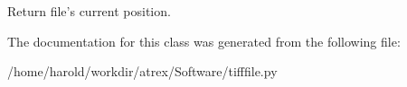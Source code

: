 \begin{DoxyVerb}Return file's current position.\end{DoxyVerb}
 

The documentation for this class was generated from the following file\-:\begin{DoxyCompactItemize}
\item 
/home/harold/workdir/atrex/\-Software/tifffile.\-py\end{DoxyCompactItemize}
